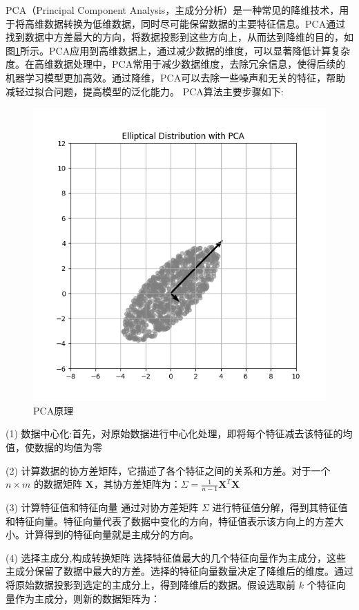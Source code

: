PCA（Principal Component Analysis，主成分分析）是一种常见的降维技术，用于将高维数据转换为低维数据，同时尽可能保留数据的主要特征信息。PCA通过找到数据中方差最大的方向，将数据投影到这些方向上，从而达到降维的目的，如图\ref{tag:pca}所示。PCA应用到高维数据上，通过减少数据的维度，可以显著降低计算复杂度。在高维数据处理中，PCA常用于减少数据维度，去除冗余信息，使得后续的机器学习模型更加高效。通过降维，PCA可以去除一些噪声和无关的特征，帮助减轻过拟合问题，提高模型的泛化能力。 PCA算法主要步骤如下\cite{jolliffe1986principal}:
\begin{figure}[h]
    \centering
    \includegraphics[width=0.8\linewidth]{assets/pca.png}
    \caption{PCA原理}
    \label{tag:pca}
\end{figure}

 (1) 数据中心化:首先，对原始数据进行中心化处理，即将每个特征减去该特征的均值，使数据的均值为零

 (2) 计算数据的协方差矩阵，它描述了各个特征之间的关系和方差。对于一个 \(n \times m\) 的数据矩阵 \(\mathbf{X}\)，其协方差矩阵为：$\Sigma = \frac{1}{n-1} \mathbf{X}^T \mathbf{X}$


(3) 计算特征值和特征向量
通过对协方差矩阵 \(\Sigma\) 进行特征值分解，得到其特征值和特征向量。特征向量代表了数据中变化的方向，特征值表示该方向上的方差大小。计算得到的特征向量就是主成分的方向。


(4) 选择主成分,构成转换矩阵
选择特征值最大的几个特征向量作为主成分，这些主成分保留了数据中最大的方差。选择的特征向量数量决定了降维后的维度。通过将原始数据投影到选定的主成分上，得到降维后的数据。假设选取前 \(k\) 个特征向量作为主成分，则新的数据矩阵为：

